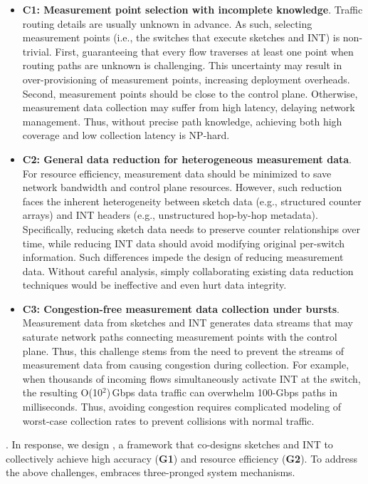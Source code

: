 \begin{itemize}[leftmargin=*]
%
    \item \textbf{C1: Measurement point selection with incomplete knowledge}. Traffic routing details are usually unknown in advance. As such, selecting measurement points (i.e., the switches that execute sketches and INT) is non-trivial. First, guaranteeing that every flow traverses at least one point when routing paths are unknown is challenging. This uncertainty may result in over-provisioning of measurement points, increasing deployment overheads. Second, measurement points should be close to the control plane. Otherwise, measurement data collection may suffer from high latency, delaying network management. Thus, without precise path knowledge, achieving both high coverage and low collection latency is NP-hard. 
%
    \item \textbf{C2: General data reduction for heterogeneous measurement data}. For resource efficiency, measurement data should be minimized to save network bandwidth and control plane resources. However, such reduction faces the inherent heterogeneity between sketch data (e.g., structured counter arrays) and INT headers (e.g., unstructured hop-by-hop metadata). Specifically, reducing sketch data needs to preserve counter relationships over time, while reducing INT data should avoid modifying original per-switch information. Such differences impede the design of reducing measurement data. Without careful analysis, simply collaborating existing data reduction techniques would be ineffective and even hurt data integrity. 
%
    \item \textbf{C3: Congestion-free measurement data collection under bursts}. Measurement data from sketches and INT generates data streams that may saturate network paths connecting measurement points with the control plane. Thus, this challenge stems from the need to prevent the streams of measurement data from causing congestion during collection. For example, when thousands of incoming flows simultaneously activate INT at the switch, the resulting O(10$^2$)\,Gbps data traffic can overwhelm 100-Gbps paths in milliseconds. Thus, avoiding congestion requires complicated modeling of worst-case collection rates to prevent collisions with normal traffic. 
%
\end{itemize}

. In response, we design \sysname, a framework that co-designs sketches and INT to collectively achieve high accuracy (\textbf{G1}) and resource efficiency (\textbf{G2}). To address the above challenges, \sysname embraces three-pronged system mechanisms. 

